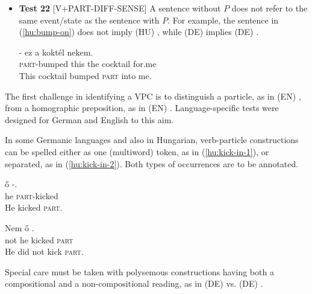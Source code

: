 \documentclass[output=paper,
modfonts,
]{langscibook}
\begin{document}
\begin{itemize}
\item[] \textbf{Test 22} [V+PART-DIFF-SENSE] A sentence without $P$ does not refer to the same event/state as the sentence with $P$.  For example, the sentence in (\ref{hu:bump-on})
does not imply (HU) , while (DE)  implies (DE) . 


\ea \label{hu:bump-on}
\settowidth {}
\gll  {}- ez a koktél nekem. \\
\textsc{part}-bumped this the cocktail for.me\\ 
\glt This cocktail bumped \textsc{part} into me. 
\z

\end{itemize}

The first challenge in identifying a VPC is to distinguish a particle, as in (EN) ,  from a homographic preposition, as in (EN) . Language-specific tests were designed for German and English to this aim.

In some Germanic languages and also in Hungarian, verb-particle constructions can be spelled either as one (multiword) token, as in (\ref{hu:kick-in-1}), 
or separated, as in (\ref{hu:kick-in-2}). %
Both types of occurrences are to be annotated.


\ea \label{hu:kick-in-1}
\settowidth {}
\gll  ő -. \\
he \textsc{part}-kicked\\ 
\glt He kicked \textsc{part}. 
\z

\ea \label{hu:kick-in-2}
\settowidth {}
\gll Nem ő  . \\
not he kicked \textsc{part}\\ 
\glt He did not kick \textsc{part}. 
\z

Special care must be taken with polysemous constructions having both a compositional and a non-compositional reading, as in (DE)   vs. (DE) .
\end{document}
